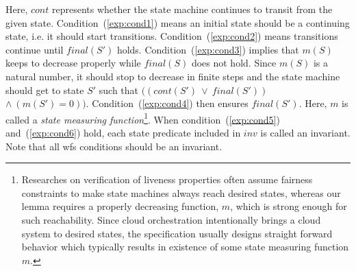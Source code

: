 \documentclass[12pt]{report}
\begin{document}
Here, $cont$ represents whether the state machine continues to transit
from the given state.  Condition~(\ref{exp:cond1}) means an initial state should be
a continuing state, i.e. it should start transitions. Condition~(\ref{exp:cond2})
means transitions continue until $final(S')$ holds. Condition~(\ref{exp:cond3})
implies that $m(S)$ keeps to decrease properly while $final(S)$ does
not hold. Since $m(S)$ is a natural number, it should stop to decrease
in finite steps and the state machine should get to state $S'$ such
that $((cont(S')\ \lor\ final(S'))$ $\land\ (m(S') = 0))$.
Condition~(\ref{exp:cond4}) then ensures $final(S')$. Here, $m$ is called a {\it
  state measuring function}\footnote{Researches on verification of
  liveness properties often assume fairness constraints to make state
  machines always reach desired states, whereas our lemma requires a
  properly decreasing function, $m$, which is strong enough for such
  reachability.  Since cloud orchestration intentionally brings a
  cloud system to desired states, the specification usually designs
  straight forward behavior which typically results in existence of
  some state measuring function $m$.}.  When condition~(\ref{exp:cond5}) and~(\ref{exp:cond6})
hold, each state predicate included in $inv$ is called an
invariant. Note that all wfs conditions should be an invariant.

\end{document}
